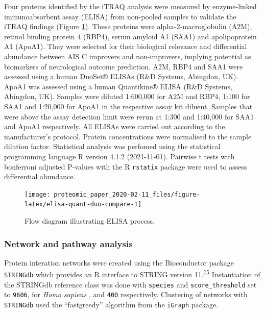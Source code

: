 \documentclass[
]{article}
\begin{document}
Four proteins identified by the iTRAQ analysis were measured by enzyme-linked immunoabsorbent assay (ELISA) from non-pooled samples to validate the iTRAQ findings (Figure \ref{fig:elisa-quant-duo-compare}).
These proteins were alpha-2-macroglobulin (A2M), retinol binding protein 4 (RBP4), serum amyloid A1 (SAA1) and apolipoprotein A1 (ApoA1).
They were selected for their biological relevance and differential abundance between AIS C improvers and non-improvers, implying potential as biomarkers of neurological outcome prediction.
A2M, RBP4 and SAA1 were assessed using a human DuoSet® ELISAs (R\&D Systems, Abingdon, UK).
ApoA1 was assessed using a human Quantikine® ELISA (R\&D Systems, Abingdon, UK).
Samples were diluted 1:600,000 for A2M and RBP4, 1:100 for SAA1 and 1:20,000 for ApoA1 in the respective assay kit diluent.
Samples that were above the assay detection limit were rerun at 1:300 and 1:40,000 for SAA1 and ApoA1 respectively.
All ELISAs were carried out according to the manufacturer's protocol.
Protein concentrations were normalised to the sample dilution factor.
Statistical analysis was perfomed using the statistical programming language R version 4.1.2 (2021-11-01).
Pairwise t tests with bonferroni adjusted P-values with the R \texttt{rstatix} package were used to assess differential abundance.

\clearpage



\begin{figure}
\texttt{[image: proteomic\_paper\_2020-02-11\_files/figure-latex/elisa-quant-duo-compare-1]} \caption{Flow diagram illustrating ELISA process.}\label{fig:elisa-quant-duo-compare}
\end{figure}

\hypertarget{pathway-analysis-chap3}{%
\subsubsection{Network and pathway analysis}\label{pathway-analysis-chap3}}

Protein interation networks were created using the Bioconductor package \texttt{STRINGdb} which provides an R interface to STRING version 11.\textsuperscript{\protect\hyperlink{ref-szklarczyk_string_2019}{75}}
Instantiation of the STRINGdb reference class was done with \texttt{species} and \texttt{score\_threshold} set to \texttt{9606}, for \emph{Homo sapiens} , and \texttt{400} respectively.
Clustering of networks with \texttt{STRINGdb} used the ``fastgreedy'' algorithm from the \texttt{iGraph} package.
\end{document}

